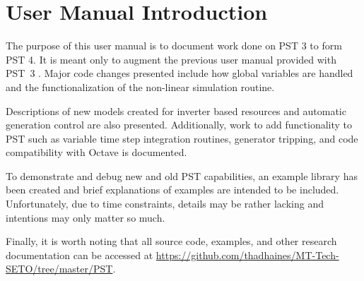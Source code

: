 \vspace{2em} %
\chapter*{User Manual Introduction}

\vspace{1em}
The purpose of this user manual is to document work done on PST 3 to form PST 4. 
It is meant only to augment the previous user manual provided with \mbox{PST 3} \cite{PST3manual}.
%
Major code changes presented include 
how global variables are handled
and the
functionalization of the non-linear simulation routine.

\vspace{1em}
Descriptions of new models created for
inverter based resources
and
automatic generation control
are also presented.
Additionally, work to add functionality to PST such as
variable time step integration routines,
generator tripping, %
and
code compatibility with Octave
is documented.



\vspace{1em}
To demonstrate and debug new and old PST capabilities, an example library has been created and brief explanations of examples are intended to be included.
Unfortunately, due to time constraints, details may be rather lacking and intentions may only matter so much.

\vspace{1em}
Finally, it is worth noting that all source code, examples, and other research documentation can be accessed at 
\href{https://github.com/thadhaines/MT-Tech-SETO/tree/master/PST}{https://github.com/thadhaines/MT-Tech-SETO/tree/master/PST}.